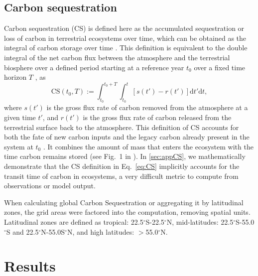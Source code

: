 \documentclass[ProofPDF]{./Styles/Jnls-Template-V3}
\begin{document}




\subsection{Carbon sequestration} 
Carbon sequestration (CS) is defined here as the accumulated sequestration or loss of carbon in terrestrial ecosystems over time, which can be obtained as the integral of carbon storage over time \cite{Sierra2021}. This definition is equivalent to the double integral of the net carbon flux between the atmosphere and the terrestrial biosphere over a defined period starting at a reference year $t_0$ over a fixed time horizon $T$ \citep{Sierra2021,Metzler2024,Sierra2025}, as
\begin{equation} \label{eq:CS}
    \mbox{CS}\left(t_0,T\right):=\int^{t_0+T}_{t_0} \int^{t}_{t_0} \left[s(t')-r(t')\right]\mathrm{d}t'\mathrm{d}t,
\end{equation}
where $s(t')$ is the gross flux rate of carbon removed from the atmosphere at a given time $t'$, and $r(t')$ is the gross flux rate of carbon released from the terrestrial surface back to the atmosphere. This definition of CS accounts for both the fate of new carbon inputs and the legacy carbon already present in the system at $t_0$ \citep{Metzler2024}. It combines the amount of mass that enters the ecosystem with the time carbon remains stored (see Fig.~1 in \citet{Munoz2024}). In \ref{sec:appCS}, we mathematically demonstrate that the CS definition in Eq.~\ref{eq:CS} implicitly accounts for the transit time of carbon in ecosystems, a very difficult metric to compute from observations or model output.

When calculating global Carbon Sequestration or aggregating it by latitudinal zones, the grid areas were factored into the computation, removing spatial units. Latitudinal zones are defined as tropical: 22.5$^\circ$S-22.5$^\circ$N, mid-latitudes: 22.5$^\circ$S-55.0$^\circ$S and 22.5$^\circ$N-55.0S$^\circ$N, and high latitudes: $>$55.0$^\circ$N.


\section{Results}
\end{document}
